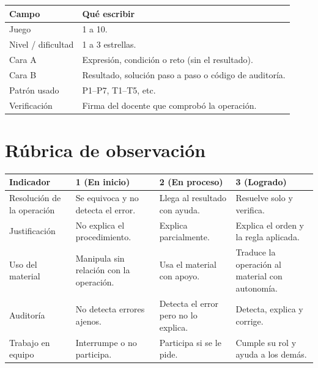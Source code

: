 \documentclass[12pt, letterpaper]{article}
\begin{document}
\begin{center}
\small
\begin{tabular}{@{}l p{10.5cm}@{}}
\toprule
\textbf{Campo} & \textbf{Qué escribir}\\
\midrule
Juego & 1 a 10.\\
Nivel / dificultad & 1 a 3 estrellas.\\
Cara A & Expresión, condición o reto (sin el resultado).\\
Cara B & Resultado, solución paso a paso o código de auditoría.\\
Patrón usado & P1--P7, T1--T5, etc.\\
Verificación & Firma del docente que comprobó la operación.\\
\bottomrule
\end{tabular}
\end{center}

\section{Rúbrica de observación}

\begin{center}
\small
\begin{tabular}{@{}p{3.4cm} p{3.6cm} p{3.6cm} p{3.6cm}@{}}
\toprule
\textbf{Indicador} & \textbf{1 (En inicio)} & \textbf{2 (En proceso)} & \textbf{3 (Logrado)}\\
\midrule
Resolución de la operación & Se equivoca y no detecta el error. & Llega al resultado con ayuda. & Resuelve solo y verifica.\\
Justificación & No explica el procedimiento. & Explica parcialmente. & Explica el orden y la regla aplicada.\\
Uso del material & Manipula sin relación con la operación. & Usa el material con apoyo. & Traduce la operación al material con autonomía.\\
Auditoría & No detecta errores ajenos. & Detecta el error pero no lo explica. & Detecta, explica y corrige.\\
Trabajo en equipo & Interrumpe o no participa. & Participa si se le pide. & Cumple su rol y ayuda a los demás.\\
\bottomrule
\end{tabular}
\end{center}
\end{document}
